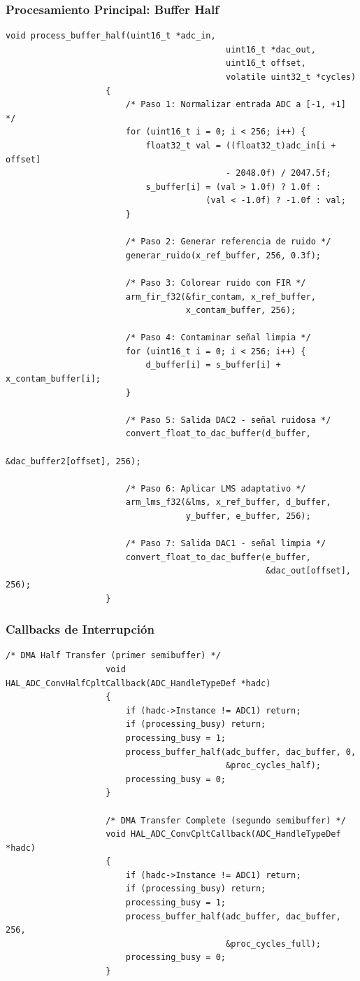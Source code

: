 \documentclass[12pt]{article}
\begin{document}
			\subsubsection{Procesamiento Principal: Buffer Half}

				\begin{lstlisting}[style=mystyle]
					void process_buffer_half(uint16_t *adc_in, 
											uint16_t *dac_out,
											uint16_t offset, 
											volatile uint32_t *cycles)
					{
						/* Paso 1: Normalizar entrada ADC a [-1, +1] */
						for (uint16_t i = 0; i < 256; i++) {
							float32_t val = ((float32_t)adc_in[i + offset] 
											- 2048.0f) / 2047.5f;
							s_buffer[i] = (val > 1.0f) ? 1.0f : 
										(val < -1.0f) ? -1.0f : val;
						}
						
						/* Paso 2: Generar referencia de ruido */
						generar_ruido(x_ref_buffer, 256, 0.3f);
						
						/* Paso 3: Colorear ruido con FIR */
						arm_fir_f32(&fir_contam, x_ref_buffer, 
									x_contam_buffer, 256);
						
						/* Paso 4: Contaminar señal limpia */
						for (uint16_t i = 0; i < 256; i++) {
							d_buffer[i] = s_buffer[i] + x_contam_buffer[i];
						}
						
						/* Paso 5: Salida DAC2 - señal ruidosa */
						convert_float_to_dac_buffer(d_buffer, 
													&dac_buffer2[offset], 256);
						
						/* Paso 6: Aplicar LMS adaptativo */
						arm_lms_f32(&lms, x_ref_buffer, d_buffer, 
									y_buffer, e_buffer, 256);
						
						/* Paso 7: Salida DAC1 - señal limpia */
						convert_float_to_dac_buffer(e_buffer, 
													&dac_out[offset], 256);
					}
				\end{lstlisting}

			\subsubsection{Callbacks de Interrupción}

				\begin{lstlisting}[style=mystyle]
					/* DMA Half Transfer (primer semibuffer) */
					void HAL_ADC_ConvHalfCpltCallback(ADC_HandleTypeDef *hadc)
					{
						if (hadc->Instance != ADC1) return;
						if (processing_busy) return;
						processing_busy = 1;
						process_buffer_half(adc_buffer, dac_buffer, 0, 
											&proc_cycles_half);
						processing_busy = 0;
					}

					/* DMA Transfer Complete (segundo semibuffer) */
					void HAL_ADC_ConvCpltCallback(ADC_HandleTypeDef *hadc)
					{
						if (hadc->Instance != ADC1) return;
						if (processing_busy) return;
						processing_busy = 1;
						process_buffer_half(adc_buffer, dac_buffer, 256, 
											&proc_cycles_full);
						processing_busy = 0;
					}
				\end{lstlisting}
	
\end{document}
